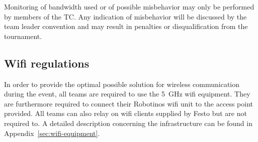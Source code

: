 \documentclass[12pt,twoside]{article}
\newenvironment{rulechange}{}{}
\begin{document}
Monitoring of bandwidth used or of possible misbehavior may only be
performed by members of the TC.
Any indication of misbehavior will be discussed by the team leader
convention and may result in penalties or disqualification from the
tournament.



\subsection{Wifi regulations}
\label{sec:wifi-regulations}
In order to provide the optimal possible solution for wireless
communication during the event, all teams are required to use the \SI{5}{\giga\hertz} wifi equipment. They are furthermore required to connect their
Robotinos wifi unit to the access point provided. All teams can also
relay on wifi clients supplied by Festo but are not required to. A
detailed description concerning the infrastructure can be found in
Appendix~\ref{sec:wifi-equipment}.


\end{document}
